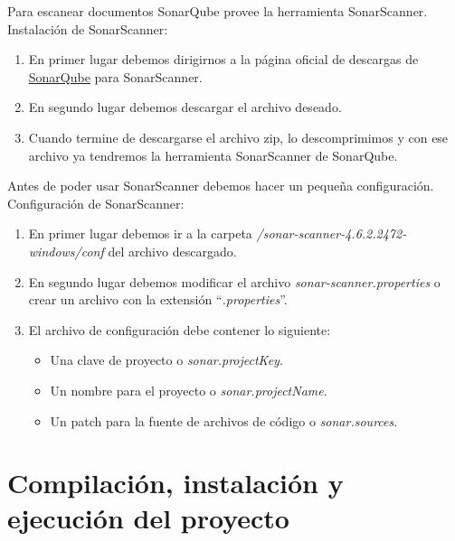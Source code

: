 Para escanear documentos SonarQube provee la herramienta SonarScanner.\\
Instalación de SonarScanner:

\begin{enumerate}
\item
	En primer lugar debemos dirigirnos a la página oficial de descargas de \href{https://docs.sonarqube.org/latest/analysis/scan/sonarscanner/}{SonarQube} para SonarScanner.
\item
	En segundo lugar debemos descargar el archivo deseado.
\item 
	Cuando termine de descargarse el archivo zip, lo descomprimimos y con ese archivo ya tendremos la herramienta SonarScanner de SonarQube.
\end{enumerate}

Antes de poder usar SonarScanner debemos hacer un pequeña configuración.\\

Configuración de SonarScanner:

\begin{enumerate}
\item
	En primer lugar debemos ir a la carpeta \textit{/sonar-scanner-4.6.2.2472-windows/conf} del archivo descargado.
\item
	En segundo lugar debemos modificar el archivo \textit{sonar-scanner.properties} o crear un archivo con la extensión ``\textit{.properties}''.
\item 
	El archivo de configuración debe contener lo siguiente:
	\begin{itemize}
	\item
		Una clave de proyecto o \textit{sonar.projectKey}.
	\item
		Un nombre para el proyecto o \textit{sonar.projectName}.
	\item
		Un patch para la fuente de archivos de código o \textit{sonar.sources}.
	\end{itemize}
\end{enumerate}



\section{Compilación, instalación y ejecución del proyecto}

